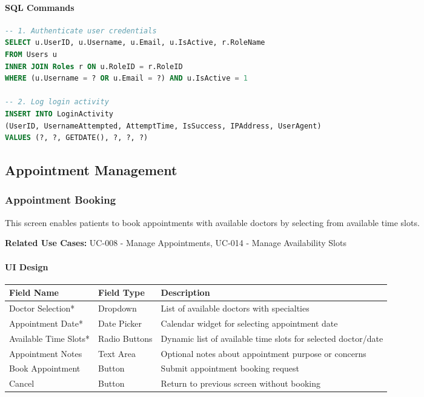 \documentclass[12pt,a4paper]{article}
\begin{document}
\paragraph{SQL Commands}

\begin{lstlisting}[language=SQL]
-- 1. Authenticate user credentials
SELECT u.UserID, u.Username, u.Email, u.IsActive, r.RoleName
FROM Users u 
INNER JOIN Roles r ON u.RoleID = r.RoleID
WHERE (u.Username = ? OR u.Email = ?) AND u.IsActive = 1

-- 2. Log login activity
INSERT INTO LoginActivity 
(UserID, UsernameAttempted, AttemptTime, IsSuccess, IPAddress, UserAgent)
VALUES (?, ?, GETDATE(), ?, ?, ?)
\end{lstlisting}

\subsection{Appointment Management}

\subsubsection{Appointment Booking}

This screen enables patients to book appointments with available doctors by selecting from available time slots.

\textbf{Related Use Cases:} UC-008 - Manage Appointments, UC-014 - Manage Availability Slots

\paragraph{UI Design}

\begin{longtable}{|p{3cm}|p{3cm}|p{8cm}|}
\hline
\textbf{Field Name} & \textbf{Field Type} & \textbf{Description} \\
\hline
Doctor Selection* & Dropdown & List of available doctors with specialties \\
\hline
Appointment Date* & Date Picker & Calendar widget for selecting appointment date \\
\hline
Available Time Slots* & Radio Buttons & Dynamic list of available time slots for selected doctor/date \\
\hline
Appointment Notes & Text Area & Optional notes about appointment purpose or concerns \\
\hline
Book Appointment & Button & Submit appointment booking request \\
\hline
Cancel & Button & Return to previous screen without booking \\
\hline
\end{longtable}
\end{document}
